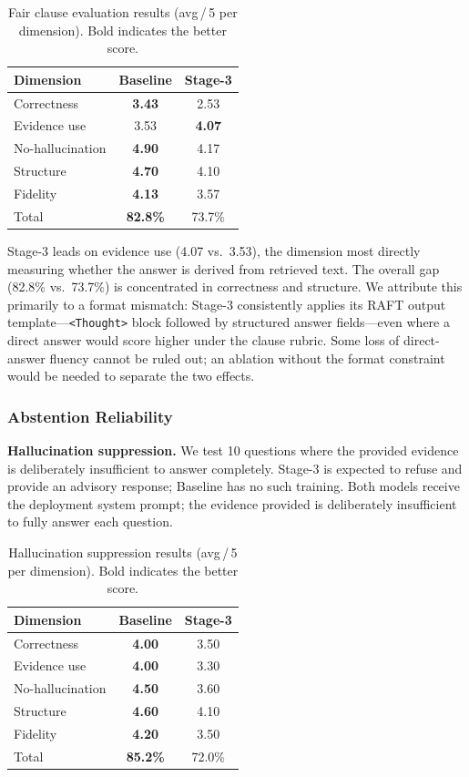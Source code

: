 \begin{table}[htbp]
\centering
\caption{Fair clause evaluation results (avg\,/\,5 per dimension).
Bold indicates the better score.}
\label{tab:clause}
\small
\begin{tabular}{@{}lcc@{}}
\toprule
Dimension & Baseline & Stage-3 \\
\midrule
Correctness       & \textbf{3.43} & 2.53 \\
Evidence use      & 3.53          & \textbf{4.07} \\
No-hallucination  & \textbf{4.90} & 4.17 \\
Structure         & \textbf{4.70} & 4.10 \\
Fidelity          & \textbf{4.13} & 3.57 \\
\midrule
Total             & \textbf{82.8\%} & 73.7\% \\
\bottomrule
\end{tabular}
\end{table}

Stage-3 leads on evidence use (4.07 vs.\ 3.53), the dimension most directly
measuring whether the answer is derived from retrieved text.
The overall gap (82.8\% vs.\ 73.7\%) is concentrated in correctness and
structure.
We attribute this primarily to a format mismatch: Stage-3 consistently applies
its RAFT output template---\texttt{<Thought>} block followed by structured
answer fields---even where a direct answer would score higher under the clause
rubric.
Some loss of direct-answer fluency cannot be ruled out; an ablation without
the format constraint would be needed to separate the two effects.

\subsubsection{Abstention Reliability}
\label{sec:abstention}

\noindent\textbf{Hallucination suppression.}
We test 10 questions where the provided evidence is deliberately insufficient
to answer completely.
Stage-3 is expected to refuse and provide an advisory response; Baseline has
no such training.
Both models receive the deployment system prompt; the evidence provided is
deliberately insufficient to fully answer each question.

\begin{table}[htbp]
\centering
\caption{Hallucination suppression results (avg\,/\,5 per dimension).
Bold indicates the better score.}
\label{tab:hall}
\small
\begin{tabular}{@{}lcc@{}}
\toprule
Dimension & Baseline & Stage-3 \\
\midrule
Correctness       & \textbf{4.00} & 3.50 \\
Evidence use      & \textbf{4.00} & 3.30 \\
No-hallucination  & \textbf{4.50} & 3.60 \\
Structure         & \textbf{4.60} & 4.10 \\
Fidelity          & \textbf{4.20} & 3.50 \\
\midrule
Total             & \textbf{85.2\%} & 72.0\% \\
\bottomrule
\end{tabular}
\end{table}

